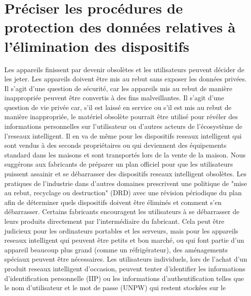 \documentclass[12pt]{report}
\begin{document}
\hypertarget{pruxe9ciser-les-procuxe9dures-de-protection-des-donnuxe9es-relatives-uxe0-luxe9limination-des-dispositifs}{%
      \section{\texorpdfstring{Préciser les procédures de protection des
              données relatives à l'élimination des dispositifs
        }{Préciser les procédures de protection des données relatives à l'élimination des dispositifs }}\label{pruxe9ciser-les-procuxe9dures-de-protection-des-donnuxe9es-relatives-uxe0-luxe9limination-des-dispositifs}}

Les appareils finissent par devenir obsolètes et les utilisateurs
peuvent décider de les jeter. Les appareils doivent être mis au rebut
sans exposer les données privées. Il s'agit d'une question de sécurité,
car les appareils mis au rebut de manière inappropriée peuvent être
convertis à des fins malveillantes. Il s'agit d'une question de vie
privée car, s'il est laissé en service ou s'il est mis au rebut de
manière inappropriée, le matériel obsolète pourrait être utilisé pour
révéler des informations personnelles sur l'utilisateur ou d'autres
acteurs de l'écosystème de l'reseaux intelligent. Il en va de même pour les dispositifs
reseaux intelligent qui sont vendus à des seconds propriétaires ou qui deviennent des
équipements standard dans les maisons et sont transportés lors de la
vente de la maison. Nous suggérons aux fabricants de préparer un plan
officiel pour que les utilisateurs puissent assainir et se débarrasser
des dispositifs reseaux intelligent obsolètes. Les pratiques de l'industrie dans
d'autres domaines prescrivent une politique de "mise au rebut, recyclage
ou destruction" (DRD) avec une révision périodique du plan afin de
déterminer quels dispositifs doivent être éliminés et comment s'en
débarrasser. Certains fabricants encouragent les utilisateurs à se
débarrasser de leurs produits directement par l'intermédiaire du
fabricant. Cela peut être judicieux pour les ordinateurs portables et
les serveurs, mais pour les appareils reseaux intelligent qui peuvent être petits et bon
marché, ou qui font partie d'un appareil beaucoup plus grand (comme un
réfrigérateur), des aménagements spéciaux peuvent être nécessaires. Les
utilisateurs individuels, lors de l'achat d'un produit reseaux intelligent d'occasion,
peuvent tenter d'identifier les informations d'identification
personnelle (IIP) ou les informations d'authentification telles que le
nom d'utilisateur et le mot de passe (UNPW) qui restent stockées sur le
\end{document}
